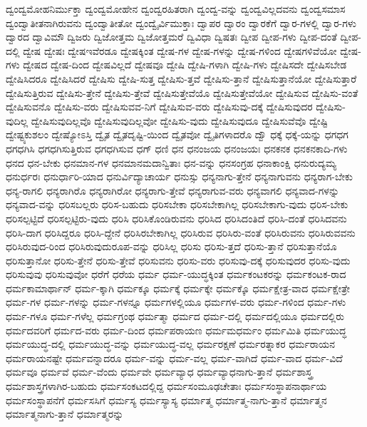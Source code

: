 {ದ್ವಂದ್ವಮೋಹನಿರ್ಮುಕ್ತಾ
ದ್ವಂದ್ವಮೋಹೇನ
ದ್ವಂದ್ವರಹಿತರಾಗಿ
ದ್ವಂದ್ವ-ವನ್ನು
ದ್ವಂದ್ವವಿಲ್ಲದವನು
ದ್ವಂದ್ವಸಮಾಸ
ದ್ವಂದ್ವಾತೀತನಾಗಿರುವನು
ದ್ವಂದ್ವಾತೀತೋ
ದ್ವಂದ್ವೈರ್ವಿಮುಕ್ತಾಃ
ದ್ವಾಪರ
ದ್ವಾರಂ
ದ್ವಾರಕೆಗೆ
ದ್ವಾರ-ಗಳಲ್ಲಿ
ದ್ವಾರ-ಗಳು
ದ್ವಾರದ
ದ್ವಾವಿಮೌ
ದ್ವಿಜರು
ದ್ವಿಜೋತ್ತಮ
ದ್ವಿಜೋತ್ತಮರೆ
ದ್ವಿವಿಧಾ
ದ್ವಿಷತಃ
ದ್ವೀಪ
ದ್ವೀಪ-ಗಳು
ದ್ವೀಪ-ದಂತೆ
ದ್ವೀಪ-ದಲ್ಲಿ
ದ್ವೇಷ
ದ್ವೇಷಃ
ದ್ವೇಷಇವೆರಡೂ
ದ್ವೇಷಕ್ಕಿಂತ
ದ್ವೇಷ-ಗಳ
ದ್ವೇಷ-ಗಳನ್ನು
ದ್ವೇಷ-ಗಳಿಂದ
ದ್ವೇಷಗಳಿವೆಯೋ
ದ್ವೇಷ-ಗಳು
ದ್ವೇಷದ
ದ್ವೇಷ-ದಿಂದ
ದ್ವೇಷವಿಲ್ಲದೆ
ದ್ವೇಷವೂ
ದ್ವೇಷಿ
ದ್ವೇಷಿ-ಗಳಾಗಿ
ದ್ವೇಷಿ-ಗಳು
ದ್ವೇಷಿಸದೇ
ದ್ವೇಷಿಸಬೇಡ
ದ್ವೇಷಿಸಿದರೂ
ದ್ವೇಷಿಸಿದರೆ
ದ್ವೇಷಿಸು
ದ್ವೇಷಿ-ಸುತ್ತ
ದ್ವೇಷಿಸು-ತ್ತವೆ
ದ್ವೇಷಿಸು-ತ್ತಾನೆ
ದ್ವೇಷಿಸುತ್ತಾನೆಯೋ
ದ್ವೇಷಿಸುತ್ತಾರೆ
ದ್ವೇಷಿಸುತ್ತಿರುವ
ದ್ವೇಷಿಸು-ತ್ತೇನೆ
ದ್ವೇಷಿಸು-ತ್ತೇವೆ
ದ್ವೇಷಿಸುತ್ತೇವೆಯೊ
ದ್ವೇಷಿಸುತ್ತೇವೆಯೋ
ದ್ವೇಷಿಸುವ
ದ್ವೇಷಿಸು-ವಂತೆ
ದ್ವೇಷಿಸುವನೊ
ದ್ವೇಷಿಸು-ವರು
ದ್ವೇಷಿಸುವವ-ನಿಗೆ
ದ್ವೇಷಿಸುವ-ವರು
ದ್ವೇಷಿಸುವು-ದಕ್ಕೆ
ದ್ವೇಷಿಸುವುದರ
ದ್ವೇಷಿಸು-ವುದಿಲ್ಲ
ದ್ವೇಷಿಸುವುದಿಲ್ಲವೊ
ದ್ವೇಷಿಸುವುದಿಲ್ಲವೋ
ದ್ವೇಷಿಸು-ವುದು
ದ್ವೇಷಿಸುವುದೂ
ದ್ವೇಷಿಸುವೆವೊ
ದ್ವೇಷ್ಟಿ
ದ್ವೇಷ್ಟ್ಯಕುಶಲಂ
ದ್ವೇಷ್ಯೋಽಸ್ತಿ
ದ್ವೈತ
ದ್ವೈತದೃಷ್ಟಿ-ಯಿಂದ
ದ್ವೈತವೋ
ದ್ವೈತಿಗಳಾದರೊ
ದ್ವೌ
ಧಕ್ಕೆ
ಧಕ್ಕೆ-ಯನ್ನು
ಧಗಧಗ
ಧಗಧಗಿಸಿ
ಧಗಧಗಿಸುತ್ತಿರುವ
ಧಗಧಗಿಸುವ
ಧಗ್
ಧಣಿ
ಧನ
ಧನಂಜಯ
ಧನಂಜಯಃ
ಧನಕನಕ
ಧನಕನಕಾದಿ-ಗಳು
ಧನದ
ಧನ-ಬೇಕು
ಧನಮಾನ-ಗಳ
ಧನಮಾನಮದಾನ್ವಿತಾಃ
ಧನ-ವನ್ನು
ಧನಸಂಗ್ರಹ
ಧನಾಕಾಂಕ್ಷಿ
ಧನುರುದ್ಯಮ್ಯ
ಧನುರ್ಧರಃ
ಧನುರ್ಧಾರಿ-ಯಾದ
ಧನುರ್ವಿದ್ಯಾಚಾರ್ಯ
ಧನುಸ್ಸು
ಧನ್ಯನಾಗು-ತ್ತೇನೆ
ಧನ್ಯನಾಗುವನು
ಧನ್ಯರಾಗ-ಬೇಕು
ಧನ್ಯ-ರಾಗಲಿ
ಧನ್ಯರಾಗಿರೊ
ಧನ್ಯರಾಗಿರೋ
ಧನ್ಯರಾಗು-ತ್ತೇವೆ
ಧನ್ಯರಾಗುವ-ವರು
ಧನ್ಯವಾಗಲಿ
ಧನ್ಯವಾದ-ಗಳನ್ನು
ಧನ್ಯವಾದ-ವನ್ನು
ಧರಿಸಬಲ್ಲರು
ಧರಿಸ-ಬಹುದು
ಧರಿಸಬೇಕಾ
ಧರಿಸಬೇಕಾಗಿಲ್ಲ
ಧರಿಸಬೇಕಾಗು-ವುದು
ಧರಿಸ-ಬೇಕು
ಧರಿಸಲ್ಪಟ್ಟಿದೆ
ಧರಿಸಲ್ಪಟ್ಟಿರು-ವುದು
ಧರಿಸಿ
ಧರಿಸಿಕೊಂಡಿರುವನು
ಧರಿಸಿದ
ಧರಿಸಿದಂತಿದೆ
ಧರಿಸಿ-ದಂತೆ
ಧರಿಸಿದವನು
ಧರಿಸಿ-ದಾಗ
ಧರಿಸಿದ್ದರೂ
ಧರಿಸಿ-ದ್ದೇನೆ
ಧರಿಸಿರಬೇಕಾಗಿಲ್ಲ
ಧರಿಸಿರುವ
ಧರಿಸಿರು-ವಂತೆ
ಧರಿಸಿರುವನು
ಧರಿಸಿರುವವನು
ಧರಿಸಿರುವುದ-ರಿಂದ
ಧರಿಸಿರುವುದುರೂಪ-ವನ್ನು
ಧರಿಸಿಲ್ಲ
ಧರಿಸು
ಧರಿಸು-ತ್ತದೆ
ಧರಿಸು-ತ್ತಾನೆ
ಧರಿಸುತ್ತಾನೆಯೊ
ಧರಿಸುತ್ತಾನೋ
ಧರಿಸು-ತ್ತೇನೆ
ಧರಿಸು-ತ್ತೇವೆ
ಧರಿಸುವನು
ಧರಿಸು-ವರು
ಧರಿಸುವು-ದಕ್ಕೆ
ಧರಿಸುವುದರ
ಧರಿಸು-ವುದು
ಧರಿಸುವುವು
ಧರಿಸುವುವೋ
ಧರೆಗೆ
ಧರೆಯ
ಧರ್ಮ
ಧರ್ಮ-ಯುದ್ಧಕ್ಕಿಂತ
ಧರ್ಮಕಂಟಕರನ್ನು
ಧರ್ಮಕಂಟಕ-ರಾದ
ಧರ್ಮಕಾಮಾರ್ಥಾನ್
ಧರ್ಮ-ಕ್ಕಾಗಿ
ಧರ್ಮಕ್ಕೂ
ಧರ್ಮಕ್ಕೆ
ಧರ್ಮಕ್ಕೇ
ಧರ್ಮಕ್ಕೊ
ಧರ್ಮಕ್ಷೇತ್ರ-ವಾದ
ಧರ್ಮಕ್ಷೇತ್ರೇ
ಧರ್ಮ-ಗಳ
ಧರ್ಮ-ಗಳನ್ನು
ಧರ್ಮ-ಗಳನ್ನೂ
ಧರ್ಮಗಳಲ್ಲಿಯೂ
ಧರ್ಮಗಳ-ವರು
ಧರ್ಮ-ಗಳಿಂದ
ಧರ್ಮ-ಗಳು
ಧರ್ಮ-ಗಳೂ
ಧರ್ಮ-ಗಳೆಲ್ಲ
ಧರ್ಮಗ್ರಂಥ
ಧರ್ಮತ್ಮಾ
ಧರ್ಮದ
ಧರ್ಮ-ದಲ್ಲಿ
ಧರ್ಮದಲ್ಲಿಯೂ
ಧರ್ಮದಲ್ಲಿರು
ಧರ್ಮದವರಿಗೆ
ಧರ್ಮದ-ವರು
ಧರ್ಮ-ದಿಂದ
ಧರ್ಮಪರಾಯಣ
ಧರ್ಮಮಧರ್ಮಂ
ಧರ್ಮಮಿತಿ
ಧರ್ಮಯುದ್ಧ
ಧರ್ಮಯುದ್ಧ-ದಲ್ಲಿ
ಧರ್ಮಯುದ್ಧ-ವನ್ನು
ಧರ್ಮಯುದ್ಧ-ವಲ್ಲ
ಧರ್ಮರಕ್ಷಣೆ
ಧರ್ಮರತ್ನಾಕರ
ಧರ್ಮರಾಯನ
ಧರ್ಮರಾಯನಷ್ಟೇ
ಧರ್ಮವನ್ನಾದರೂ
ಧರ್ಮ-ವನ್ನು
ಧರ್ಮ-ವಲ್ಲ
ಧರ್ಮ-ವಾಗಿದೆ
ಧರ್ಮ-ವಾದ
ಧರ್ಮ-ವಿದೆ
ಧರ್ಮವೂ
ಧರ್ಮವೆ
ಧರ್ಮ-ವೆಂದು
ಧರ್ಮವೇ
ಧರ್ಮವ್ಯಾಧ
ಧರ್ಮವ್ಯಾಧನಾಗು-ತ್ತಾನೆ
ಧರ್ಮಶಾಸ್ತ್ರ
ಧರ್ಮಶಾಸ್ತ್ರಗಳಾಗಿರ-ಬಹುದು
ಧರ್ಮಸಂಕಟದಲ್ಲಿದ್ದ
ಧರ್ಮಸಂಮೂಢಚೇತಾಃ
ಧರ್ಮಸಂಸ್ಥಾಪನಾರ್ಥಾಯ
ಧರ್ಮಸಂಸ್ಥಾಪನೆಗೆ
ಧರ್ಮಸಸಿಗೆ
ಧರ್ಮಸ್ಯ
ಧರ್ಮಸ್ಯಾಸ್ಯ
ಧರ್ಮಾತ್ಮ
ಧರ್ಮಾತ್ಮ-ನಾಗು-ತ್ತಾನೆ
ಧರ್ಮಾತ್ಮನ
ಧರ್ಮಾತ್ಮನಾಗು-ತ್ತಾನೆ
ಧರ್ಮಾತ್ಮರನ್ನು
}
